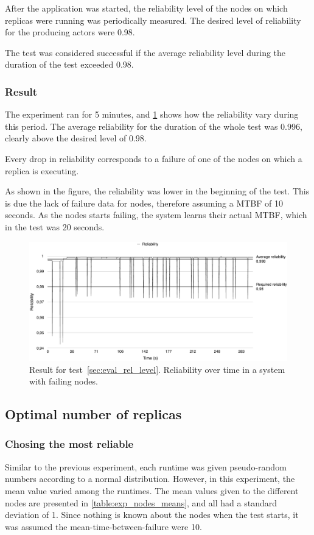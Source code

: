 \documentclass{cslthse-msc}
\begin{document}
After the application was started, the reliability level of the nodes on which replicas were running was periodically measured. The desired level of reliability for the producing actors were 0.98.

The test was considered successful if the average reliability level during the duration of the test exceeded 0.98.

\subsubsection*{Result}
The experiment ran for 5 minutes, and \cref{fig:exp_reliability_level} shows how the reliability vary during this period. The average reliability for the duration of the whole test was 0.996, clearly above the desired level of 0.98.

Every drop in reliability corresponds to a failure of one of the nodes on which a replica is executing.

As shown in the figure, the reliability was lower in the beginning of the test. This is due the lack of failure data for nodes, therefore assuming a MTBF of 10 seconds. As the nodes starts failing, the system learns their actual MTBF, which in the test was 20 seconds.

\begin{figure}[!hbt]
\centering
\includegraphics[scale=0.5]{images/results/reliability.pdf}
\caption{Result for test~\ref{sec:eval_rel_level}. Reliability over time in a system with failing nodes.} \label{fig:exp_reliability_level}
\end{figure}

\subsection{Optimal number of replicas}
\subsubsection{Chosing the most reliable} \label{sec:eval_opt_nbr_replicas}
Similar to the previous experiment, each runtime was given pseudo-random numbers according to a normal distribution. However, in this experiment, the mean value varied among the runtimes. The mean values given to the different nodes are presented in \cref{table:exp_nodes_means}, and all had a standard deviation of 1. Since nothing is known about the nodes when the test starts, it was assumed the mean-time-between-failure were 10. 
\end{document}
